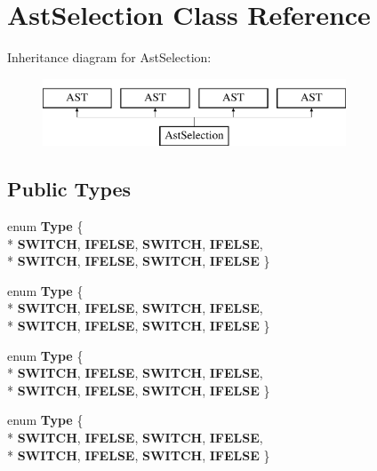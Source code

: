 \hypertarget{classAstSelection}{\section{Ast\-Selection Class Reference}
\label{classAstSelection}
}
Inheritance diagram for Ast\-Selection\-:\begin{figure}[H]
\begin{center}
\leavevmode
\includegraphics[height=2.000000cm]{classAstSelection}
\end{center}
\end{figure}
\subsection*{Public Types}
\begin{DoxyCompactItemize}
\item 
enum {\bfseries Type} \{ \\*
{\bfseries S\-W\-I\-T\-C\-H}, 
{\bfseries I\-F\-E\-L\-S\-E}, 
{\bfseries S\-W\-I\-T\-C\-H}, 
{\bfseries I\-F\-E\-L\-S\-E}, 
\\*
{\bfseries S\-W\-I\-T\-C\-H}, 
{\bfseries I\-F\-E\-L\-S\-E}, 
{\bfseries S\-W\-I\-T\-C\-H}, 
{\bfseries I\-F\-E\-L\-S\-E}
 \}
\item 
enum {\bfseries Type} \{ \\*
{\bfseries S\-W\-I\-T\-C\-H}, 
{\bfseries I\-F\-E\-L\-S\-E}, 
{\bfseries S\-W\-I\-T\-C\-H}, 
{\bfseries I\-F\-E\-L\-S\-E}, 
\\*
{\bfseries S\-W\-I\-T\-C\-H}, 
{\bfseries I\-F\-E\-L\-S\-E}, 
{\bfseries S\-W\-I\-T\-C\-H}, 
{\bfseries I\-F\-E\-L\-S\-E}
 \}
\item 
enum {\bfseries Type} \{ \\*
{\bfseries S\-W\-I\-T\-C\-H}, 
{\bfseries I\-F\-E\-L\-S\-E}, 
{\bfseries S\-W\-I\-T\-C\-H}, 
{\bfseries I\-F\-E\-L\-S\-E}, 
\\*
{\bfseries S\-W\-I\-T\-C\-H}, 
{\bfseries I\-F\-E\-L\-S\-E}, 
{\bfseries S\-W\-I\-T\-C\-H}, 
{\bfseries I\-F\-E\-L\-S\-E}
 \}
\item 
enum {\bfseries Type} \{ \\*
{\bfseries S\-W\-I\-T\-C\-H}, 
{\bfseries I\-F\-E\-L\-S\-E}, 
{\bfseries S\-W\-I\-T\-C\-H}, 
{\bfseries I\-F\-E\-L\-S\-E}, 
\\*
{\bfseries S\-W\-I\-T\-C\-H}, 
{\bfseries I\-F\-E\-L\-S\-E}, 
{\bfseries S\-W\-I\-T\-C\-H}, 
{\bfseries I\-F\-E\-L\-S\-E}
 \}
\end{DoxyCompactItemize}

